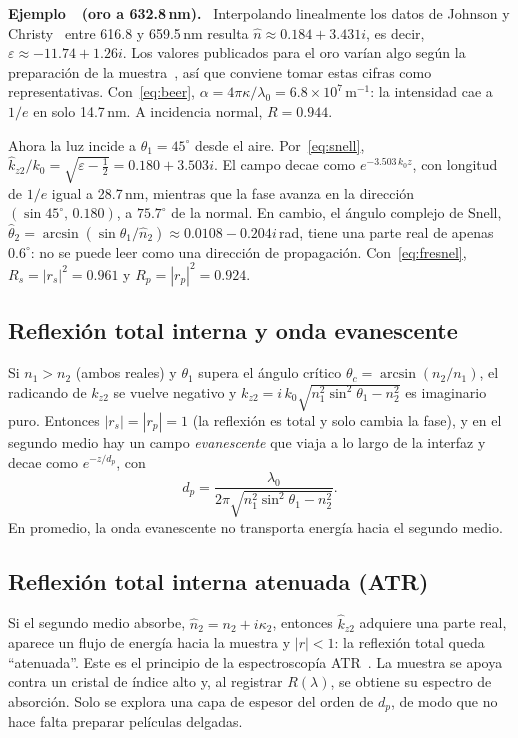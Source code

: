\documentclass[11pt,letterpaper]{article}
\newcounter{ejemplo}
\newenvironment{ejemplo}[1]{%
  \refstepcounter{ejemplo}%
  \begin{ejemplobox}\textbf{Ejemplo~\theejemplo\ (#1).}\ }%
  {\end{ejemplobox}}
\newcommand{\nh}{\hat{n}}
\newcommand{\kh}{\hat{k}}
\newcommand{\eps}{\varepsilon}
\begin{document}
\begin{ejemplo}{oro a 632.8\,nm}\label{ej:oro}
Interpolando linealmente los datos de Johnson y Christy~\cite{JohnsonChristy}
entre 616.8 y 659.5\,nm resulta $\nh\approx0.184+3.431i$, es decir,
$\eps\approx-11.74+1.26i$. Los valores publicados para el oro varían algo
según la preparación de la muestra~\cite{Olmon}, así que conviene tomar estas
cifras como representativas. Con~\eqref{eq:beer},
$\alpha=4\pi\kappa/\lambda_0=6.8\times10^{7}\,\mathrm{m^{-1}}$: la intensidad
cae a $1/e$ en solo 14.7\,nm. A incidencia normal, $R=0.944$.

Ahora la luz incide a $\theta_1=45^\circ$ desde el aire. Por~\eqref{eq:snell},
$\kh_{z2}/k_0=\sqrt{\eps-\tfrac12}=0.180+3.503i$. El campo decae como
$e^{-3.503\,k_0z}$, con longitud de $1/e$ igual a 28.7\,nm, mientras que la
fase avanza en la dirección $(\sin45^\circ,\,0.180)$, a $75.7^\circ$ de la
normal. En cambio, el ángulo complejo de Snell,
$\hat\theta_2=\arcsin(\sin\theta_1/\nh_2)\approx0.0108-0.204i$\,rad, tiene una
parte real de apenas $0.6^\circ$: no se puede leer como una dirección de
propagación. Con~\eqref{eq:fresnel}, $R_s=|r_s|^2=0.961$ y $R_p=|r_p|^2=0.924$.
\end{ejemplo}

\subsection{Reflexión total interna y onda evanescente}

Si $n_1>n_2$ (ambos reales) y $\theta_1$ supera el ángulo crítico
$\theta_c=\arcsin(n_2/n_1)$, el radicando de $k_{z2}$ se vuelve negativo y
$k_{z2}=i\,k_0\sqrt{n_1^2\sin^2\theta_1-n_2^2}$ es imaginario puro. Entonces
$|r_s|=|r_p|=1$ (la reflexión es total y solo cambia la fase), y en el segundo
medio hay un campo \emph{evanescente} que viaja a lo largo de la interfaz y
decae como $e^{-z/d_p}$, con
\begin{equation}\label{eq:dp}
  d_p=\frac{\lambda_0}{2\pi\sqrt{n_1^2\sin^2\theta_1-n_2^2}}.
\end{equation}
En promedio, la onda evanescente no transporta energía hacia el segundo medio.

\subsection{Reflexión total interna atenuada (ATR)}

Si el segundo medio absorbe, $\nh_2=n_2+i\kappa_2$, entonces $\kh_{z2}$
adquiere una parte real, aparece un flujo de energía hacia la muestra y
$|r|<1$: la reflexión total queda ``atenuada''. Este es el principio de la
espectroscopía ATR~\cite{Harrick,Fahrenfort}. La muestra se apoya contra un
cristal de índice alto y, al registrar $R(\lambda)$, se obtiene su espectro de
absorción. Solo se explora una capa de espesor del orden de $d_p$, de modo que
no hace falta preparar películas delgadas.
\end{document}
